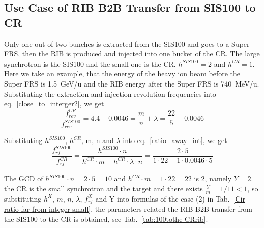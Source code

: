 \subsection{Use Case of RIB B2B Transfer from SIS100 to CR} 
\label{RIB_100_CR}
Only one out of two bunches is extracted from the SIS100 and goes to a Super FRS, then the RIB is produced and injected into one bucket of the CR. The large synchrotron is the SIS100 and the small one is the CR. $h^{\mathit{SIS100}}=2$ and $h^{\mathit{CR}}=1$. Here we take an example, that the energy of the heavy ion beam before the Super FRS is \SI{1.5}{GeV/\atomicmassunit} and the RIB energy after the Super FRS is \SI{740}{MeV/\atomicmassunit}. Substituting the extraction and injection revolution frequencies into eq.~\ref{close_to_interger2}, we get
\begin{equation} 
\frac{f_{\mathit{rev}}^{\mathit{CR}}}{f_{\mathit{rev}}^{\mathit{SIS100}}}=4.4-0.0046=\frac{m}{n}+ \lambda=\frac{22}{5}-0.0046
\end{equation}

Substituting $h^{\mathit{SIS100}}$, $h^{\mathit{CR}}$, m, n and $\lambda$ into eq.~\ref{ratio_away_int}, we get
\begin{equation} 
\frac{f_{\mathit{rf}}^{\mathit{SIS100}}}{f_{\mathit{rf}}^{\mathit{CR}}}=\frac{h^{\mathit{SIS100}}\cdot n}{h^{\mathit{CR}} \cdot m+ h^{\mathit{CR}} \cdot\lambda\cdot n}=\frac{2\cdot 5}{1 \cdot 22- 1 \cdot0.0046\cdot 5}
\end{equation}

The GCD of $h^{\mathit{SIS100}}\cdot n=2\cdot5=10$ and $h^{\mathit{CR}} \cdot m=1\cdot 22=22$ is 2, namely $Y=2$. the CR is the small synchrotron and the target and there exists $\frac{Y}{m}=1/11<1$, so substituting $h^X$, $m$, $n$, $\lambda$, $f_{\mathit{rf}}^{X}$ and Y into formulas of the case (2) in Tab.~\ref{Cir ratio far from integer small}, the parameters related the RIB B2B transfer from the SIS100 to the CR is obtained, see Tab.~\ref{tab:100tothe CRrib}.

